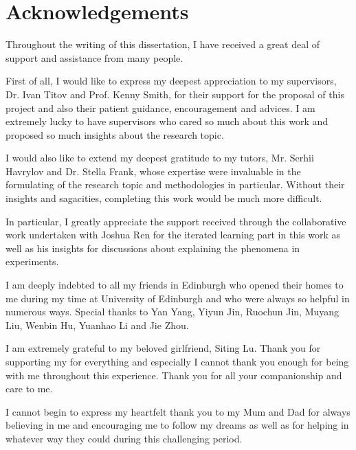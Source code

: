 \section*{Acknowledgements}
Throughout the writing of this dissertation, I have received a great deal of support and assistance from many people. 

First of all, I would like to express my deepest appreciation to my supervisors, Dr. Ivan Titov and Prof. Kenny Smith, for their support for the proposal of this project and also their patient guidance, encouragement and advices. I am extremely lucky to have supervisors who cared so much about this work and proposed so much insights about the research topic.

I would also like to extend my deepest gratitude to my tutors, Mr. Serhii Havrylov and Dr. Stella Frank, whose expertise were invaluable in the formulating of the research topic and methodologies in particular. Without their insights and sagacities, completing this work would be much more difficult.

In particular, I greatly appreciate the support received through the collaborative work undertaken with Joshua Ren for the iterated learning part in this work as well as his insights for discussions about explaining the phenomena in experiments.

I am deeply indebted to all my friends in Edinburgh who opened their homes to me during my time at University of Edinburgh and who were always so helpful in numerous ways. Special thanks to Yan Yang, Yiyun Jin, Ruochun Jin, Muyang Liu, Wenbin Hu, Yuanhao Li and Jie Zhou.

I am extremely grateful to my beloved girlfriend, Siting Lu. Thank you for supporting my for everything and especially I cannot thank you enough for being with me throughout this experience. Thank you for all your companionship and care to me.

I cannot begin to express my heartfelt thank you to my Mum and Dad for always believing in me and encouraging me to follow my dreams as well as for helping in whatever way they could during this challenging period.